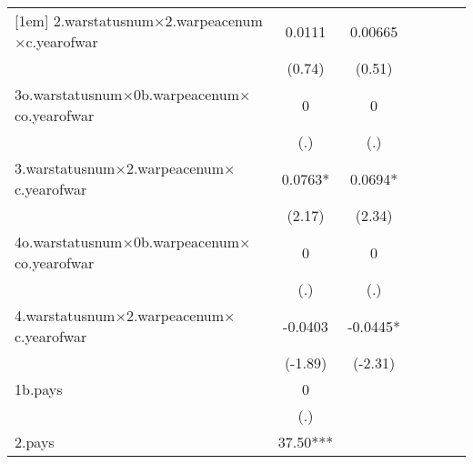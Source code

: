 {\begin{tabular}{l*{6}{c}}
[1em]
2.warstatusnum$\times$2.warpeacenum$\times$c.yearofwar&      0.0111         &     0.00665         &                     &                     &                     &                     \\
                    &      (0.74)         &      (0.51)         &                     &                     &                     &                     \\
[1em]
3o.warstatusnum$\times$0b.warpeacenum$\times$co.yearofwar&           0         &           0         &                     &                     &                     &                     \\
                    &         (.)         &         (.)         &                     &                     &                     &                     \\
[1em]
3.warstatusnum$\times$2.warpeacenum$\times$c.yearofwar&      0.0763*  &      0.0694*  &                     &                     &                     &                     \\
                    &      (2.17)         &      (2.34)         &                     &                     &                     &                     \\
[1em]
4o.warstatusnum$\times$0b.warpeacenum$\times$co.yearofwar&           0         &           0         &                     &                     &                     &                     \\
                    &         (.)         &         (.)         &                     &                     &                     &                     \\
[1em]
4.warstatusnum$\times$2.warpeacenum$\times$c.yearofwar&     -0.0403         &     -0.0445*  &                     &                     &                     &                     \\
                    &     (-1.89)         &     (-2.31)         &                     &                     &                     &                     \\
[1em]
1b.pays             &           0         &                     &                     &                     &                     &                     \\
                    &         (.)         &                     &                     &                     &                     &                     \\
[1em]
2.pays              &       37.50***&                     &                     &                     &                     &                     \\

\end{tabular}}
